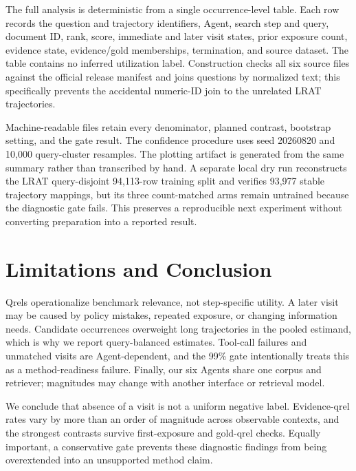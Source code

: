 The full analysis is deterministic from a single occurrence-level table. Each row records the question and trajectory identifiers, Agent, search step and query, document ID, rank, score, immediate and later visit states, prior exposure count, evidence state, evidence/gold memberships, termination, and source dataset. The table contains no inferred utilization label. Construction checks all six source files against the official release manifest and joins questions by normalized text; this specifically prevents the accidental numeric-ID join to the unrelated LRAT trajectories.

Machine-readable files retain every denominator, planned contrast, bootstrap setting, and the gate result. The confidence procedure uses seed 20260820 and 10,000 query-cluster resamples. The plotting artifact is generated from the same summary rather than transcribed by hand. A separate local dry run reconstructs the LRAT query-disjoint 94,113-row training split and verifies 93,977 stable trajectory mappings, but its three count-matched arms remain untrained because the diagnostic gate fails. This preserves a reproducible next experiment without converting preparation into a reported result.

\section{Limitations and Conclusion}

Qrels operationalize benchmark relevance, not step-specific utility. A later visit may be caused by policy mistakes, repeated exposure, or changing information needs. Candidate occurrences overweight long trajectories in the pooled estimand, which is why we report query-balanced estimates. Tool-call failures and unmatched visits are Agent-dependent, and the 99\% gate intentionally treats this as a method-readiness failure. Finally, our six Agents share one corpus and retriever; magnitudes may change with another interface or retrieval model.

We conclude that absence of a visit is not a uniform negative label. Evidence-qrel rates vary by more than an order of magnitude across observable contexts, and the strongest contrasts survive first-exposure and gold-qrel checks. Equally important, a conservative gate prevents these diagnostic findings from being overextended into an unsupported method claim.

\clearpage
